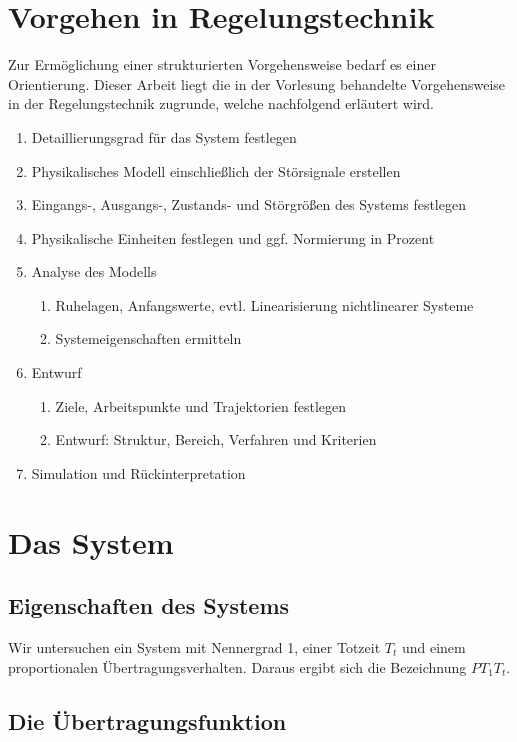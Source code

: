 \section{Vorgehen in Regelungstechnik}
Zur Ermöglichung einer strukturierten Vorgehensweise bedarf es einer Orientierung. Dieser Arbeit liegt die in der Vorlesung behandelte Vorgehensweise in der Regelungstechnik zugrunde, welche nachfolgend erläutert wird.

\begin{enumerate}
    \item Detaillierungsgrad für das System festlegen
    \item Physikalisches Modell einschließlich der Störsignale erstellen
    \item Eingangs-, Ausgangs-, Zustands- und Störgrößen des Systems festlegen
    \item Physikalische Einheiten festlegen und ggf. Normierung in Prozent
    \item Analyse des Modells
    \begin{enumerate}
        \item Ruhelagen, Anfangswerte, evtl. Linearisierung nichtlinearer Systeme
        \item Systemeigenschaften ermitteln
    \end{enumerate}
    \item Entwurf
    \begin{enumerate}
        \item Ziele, Arbeitspunkte und Trajektorien festlegen
        \item Entwurf: Struktur, Bereich, Verfahren und Kriterien
    \end{enumerate}
    \item Simulation und Rückinterpretation
\end{enumerate}

\section{Das System}


\subsection{Eigenschaften des Systems}
Wir untersuchen ein System mit Nennergrad 1, einer Totzeit $T_t$ und einem proportionalen Übertragungsverhalten. Daraus ergibt sich die Bezeichnung $PT_{1}T_{t}$.

\subsection{Die Übertragungsfunktion}

